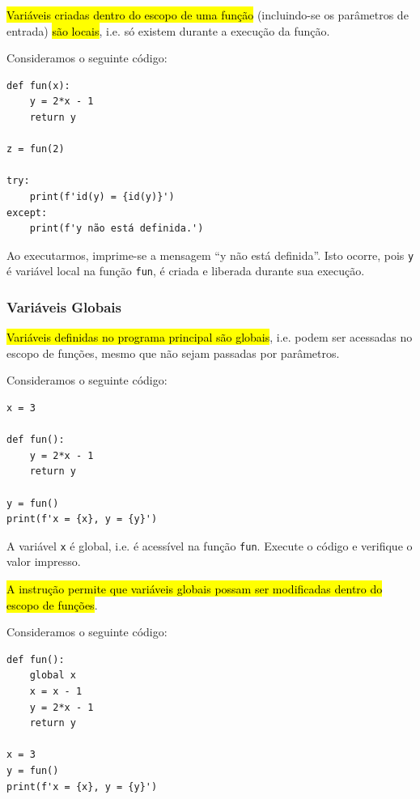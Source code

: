 \hl{Variáveis criadas dentro do escopo de uma função} (incluindo-se os parâmetros de entrada) \hl{são locais}, i.e. só existem durante a execução da função.

\begin{ex}
  Consideramos o seguinte código:

\begin{lstlisting}
def fun(x):
    y = 2*x - 1
    return y

z = fun(2)

try:
    print(f'id(y) = {id(y)}')
except:
    print(f'y não está definida.')
\end{lstlisting}
  
Ao executarmos, imprime-se a mensagem ``y não está definida''. Isto ocorre, pois \lstinline+y+ é variável local na função \lstinline+fun+, é criada e liberada durante sua execução.
\end{ex}

\subsubsection{Variáveis Globais}

\hl{Variáveis definidas no programa principal são globais}, i.e. podem ser acessadas no escopo de funções, mesmo que não sejam passadas por parâmetros.

\begin{ex}
  Consideramos o seguinte código:

\begin{lstlisting}
x = 3

def fun():
    y = 2*x - 1
    return y

y = fun()
print(f'x = {x}, y = {y}')
\end{lstlisting}
  
A variável \lstinline+x+ é global, i.e. é acessível na função \lstinline+fun+. Execute o código e verifique o valor impresso.
\end{ex}

\hl{A instrução {\PYTHONglobal} permite que variáveis globais possam ser modificadas dentro do escopo de funções}.

\begin{ex}
  Consideramos o seguinte código:

\begin{lstlisting}
def fun():
    global x
    x = x - 1
    y = 2*x - 1
    return y

x = 3
y = fun()
print(f'x = {x}, y = {y}')
\end{lstlisting}

\end{ex}

